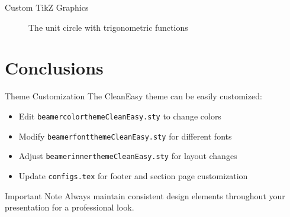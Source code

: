 \documentclass[aspectratio=169,xcolor=dvipsnames]{beamer}
\begin{document}
\begin{frame}{Custom TikZ Graphics}

  \begin{figure}
      \centering
      \caption{The unit circle with trigonometric functions}
      \label{fig:exampleTikz}
  \end{figure}
\end{frame}

\section{Conclusions}
\begin{frame}{Theme Customization}
  The CleanEasy theme can be easily customized:
  
  \begin{itemize}
    \item Edit \texttt{beamercolorthemeCleanEasy.sty} to change colors
    \item Modify \texttt{beamerfontthemeCleanEasy.sty} for different fonts
    \item Adjust \texttt{beamerinnerthemeCleanEasy.sty} for layout changes
    \item Update \texttt{configs.tex} for footer and section page customization
  \end{itemize}
  
  \begin{alertblock}{Important Note}
    Always maintain consistent design elements throughout your presentation for a professional look.
  \end{alertblock}
\end{frame}
\end{document}
